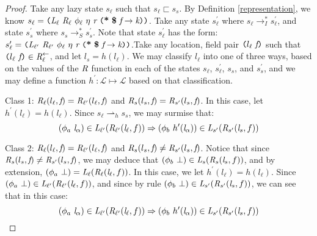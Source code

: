 \begin{proof}%
Take any lazy state $s_\ell$ such that $s_\ell \sqsubset s_s$. By Definition \ref{representation}, we know $s_\ell = \lp \cfgnt{L}_\ell\ \cfgnt{R}_\ell\ \phi_\ell\ \eta\ \cfgnt{r}\ \lp \cfgt{*}\ \cfgt{\$}\ \cfgnt{f} \rightarrow \cfgnt{k}\rp \rp$. Take any state $s_\ell^\prime$ where $s_\ell \rightarrow_I^* s_\ell^\prime$, and state $s_s^\prime$ where $s_s \rightarrow_S^* s_s^\prime$. Note that  state $s_\ell^\prime$ has the form: $s_\ell^\prime = \lp \cfgnt{L}_{\ell^\prime}\ \cfgnt{R}_{\ell^\prime}\ \phi_\ell\ \eta\ \cfgnt{r}\ \lp \cfgt{*}\ \cfgt{\$}\ \cfgnt{f} \rightarrow \cfgnt{k}\rp \rp$.Take any location, field pair $\texttt{(} l_\ell\  \emph{f}\texttt{)}$ such that $\texttt{(} l_\ell\  \emph{f}\texttt{)} \in \emph{R}_{\ell}^\leftarrow$, and let $l_s = h(l_\ell)$. We may classify $l_\ell$ into one of three ways, based on the values of the $\emph{R}$ function in each of the states $s_\ell$, $s_\ell^\prime$, $s_s$, and $s_s^\prime$, and we may define a function $h^\prime: \mathcal{L} \mapsto \mathcal{L}$ based on that classification.

Class 1: $\emph{R}_\ell ( l_\ell,  \emph{f} ) = \emph{R}_{\ell^\prime} ( l_\ell,  \emph{f} )$ and $\emph{R}_{s} ( l_s,  \emph{f} ) = \emph{R}_{s^\prime} ( l_s,  \emph{f})$. In this case, let $h^\prime(l_\ell) = h(l_\ell)$. Since $s_\ell \rightharpoonup_h s_s$, we may surmise that: 
$$(\phi_a\ \cfgnt{l}_\alpha) \in \cfgnt{L}_{\ell^\prime}(\cfgnt{R}_{\ell^\prime} (\cfgnt{l}_\ell,f )) \Rightarrow (\phi_b\ h^\prime (\cfgnt{l}_\alpha))\in \cfgnt{L}_{s^\prime}(\cfgnt{R}_{s^\prime} (\cfgnt{l}_s,f ))$$

Class 2: $\emph{R}_\ell ( l_\ell,  \emph{f}) = \emph{R}_{\ell^\prime} ( l_\ell,  \emph{f})$ and $\emph{R}_{s} ( l_s,  \emph{f}) \neq \emph{R}_{s^\prime} ( l_s,  \emph{f})$. Notice that since $\emph{R}_{s} ( l_s,  \emph{f}) \neq \emph{R}_{s^\prime} ( l_s,  \emph{f})$, we may deduce that $ (\phi_b\ \bot)\in \emph{L}_{s}(\emph{R}_{s} (\emph{l}_s,f ))$, and by extension, ${(\phi_a\ \bot)} = \emph{L}_{\ell}(\emph{R}_{\ell} (\emph{l}_\ell,f )) $. In this case, we let $h^\prime(l_\ell) = h(l_\ell)$. Since $(\phi_a\ \bot) \in \emph{L}_{\ell^\prime}(\emph{R}_{\ell^\prime} (\emph{l}_\ell,f ))$, and since by rule $ (\phi_b\ \bot)\in \cfgnt{L}_{s^\prime}(\cfgnt{R}_{s^\prime} (\cfgnt{l}_s,f ))$, we can see that in this case:
$$(\phi_a\ \cfgnt{l}_\alpha) \in \cfgnt{L}_{\ell^\prime}(\cfgnt{R}_{\ell^\prime} (\cfgnt{l}_\ell,f )) \Rightarrow (\phi_b\ h^\prime (\cfgnt{l}_\alpha))\in \cfgnt{L}_{s^\prime}(\cfgnt{R}_{s^\prime} (\cfgnt{l}_s,f ))$$


\end{proof}
